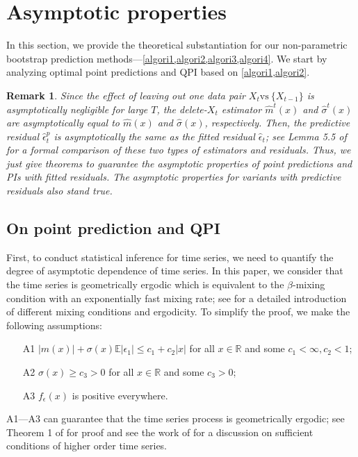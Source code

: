 \documentclass[a4paper]{article}
\newtheorem*{Remarknn}{Remark}
\begin{document}
\FloatBarrier
\section{Asymptotic properties}\label{Sec:asymptotic}
In this section, we provide the theoretical substantiation for our non-parametric bootstrap prediction methods---\cref{algori1,algori2,algori3,algori4}. We start by analyzing optimal point predictions and QPI based on \cref{algori1,algori2}. 

\begin{Remarknn}
Since the effect of leaving out
one data pair $X_t \text{vs}~\{X_{t-1}\}$ is asymptotically negligible for large $T$, the delete-$X_t$ estimator $\widehat{m}^{t}(x)$ and $\widehat{\sigma}^{t}(x)$ are asymptotically equal to $\widehat{m}(x)$ and $\widehat{\sigma}(x)$, respectively. Then, the predictive residual $\hat{\epsilon}_t^{p}$ is asymptotically the same as the fitted residual $\hat{\epsilon}_{t}$; see Lemma 5.5 of \cite{pan2016bootstrap} for a formal comparison of these two types of estimators and residuals. Thus, we just give theorems to guarantee the asymptotic properties of point predictions and PIs with fitted residuals. The asymptotic properties for variants with predictive residuals also stand true. 
\end{Remarknn}
 
\subsection{On   point prediction and QPI}
First, to conduct statistical inference for time series, we need to quantify the degree of asymptotic dependence of time series. In this paper, we consider that the time series is geometrically ergodic which is equivalent to the $\beta$-mixing condition with  an exponentially fast mixing rate; see \cite{bradley2005basic} for a detailed introduction of different mixing conditions and ergodicity. To simplify the proof, we make the  following assumptions:
\begin{itemize}
    \item [A1] $|m(x)| + \sigma(x)\mathbb{E}|\epsilon_1| \leq c_1 + c_2|x|$ for all $x\in\mathbb{R}$ and some $c_1<\infty, c_2<1$;
    \item [A2] $\sigma(x)\geq c_3>0$ for all $x\in\mathbb{R}$ and some $c_3>0$; 
    \item [A3] $f_{\epsilon}(x)$ is positive everywhere.
\end{itemize}
A1---A3 can guarantee that the time series process is geometrically ergodic; see Theorem 1 of \cite{franke2004bootstrapping} for proof and see the work of \cite{min1999probabilistic} for a discussion on sufficient conditions of higher order time series. 
\end{document}
